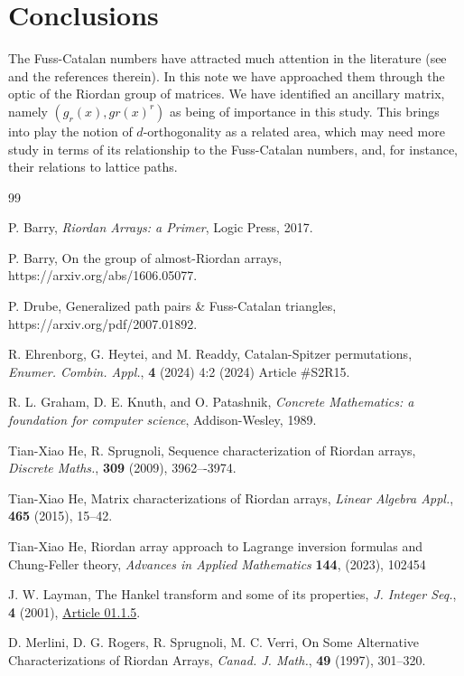 \documentclass[12pt,reqno]{article}
\theoremstyle{definition}
\begin{document}
\section{Conclusions}
The Fuss-Catalan numbers have attracted much attention in the literature (see \cite{He_CF, Qi1, Yang} and the references therein). In this note we have approached them through the optic of the Riordan group of matrices. We have identified an ancillary matrix, namely $(g_r(x), gr(x)^r)$ as being of importance in this study. This brings into play the notion of $d$-orthogonality as a related area, which may need more study in terms of its relationship to the Fuss-Catalan numbers, and, for instance, their relations to lattice paths.

\begin{thebibliography}{99}


 P. Barry, \emph{Riordan Arrays: a Primer}, Logic Press, 2017.

 P. Barry, On the group of almost-Riordan arrays, https://arxiv.org/abs/1606.05077.

 P. Drube, Generalized path pairs \& Fuss-Catalan triangles, https://arxiv.org/pdf/2007.01892.

 R. Ehrenborg, G. Heytei, and M. Readdy, Catalan-Spitzer permutations, \emph{Enumer. Combin. Appl.}, \textbf{4} (2024)  4:2 (2024) Article \#S2R15.

 R. L. Graham, D. E. Knuth, and O. Patashnik, \emph{Concrete Mathematics: a foundation for computer science}, Addison-Wesley, 1989.

 Tian-Xiao He, R. Sprugnoli, Sequence characterization of Riordan arrays, \emph{Discrete Maths.}, \textbf{309} (2009), 3962–-3974.

 Tian-Xiao He, Matrix characterizations of Riordan arrays, \emph{Linear Algebra Appl.}, \textbf{465} (2015), 15--42.

 Tian-Xiao He, Riordan array approach to Lagrange inversion formulas and Chung-Feller theory, \emph{Advances in Applied Mathematics} \textbf{144}, (2023), 102454

 J. W. Layman, The Hankel transform and some of its properties, \emph{J. Integer Seq.}, \textbf{4} (2001),
\href{https://www.cs.uwaterloo.ca/journals/JIS/VOL4/LAYMAN/hankel.html} {Article 01.1.5}.

 D. Merlini, D. G. Rogers, R. Sprugnoli, M. C. Verri, On Some Alternative Characterizations of Riordan Arrays, \emph{Canad. J. Math.}, \textbf{49} (1997), 301--320.


\end{thebibliography}
\end{document}
